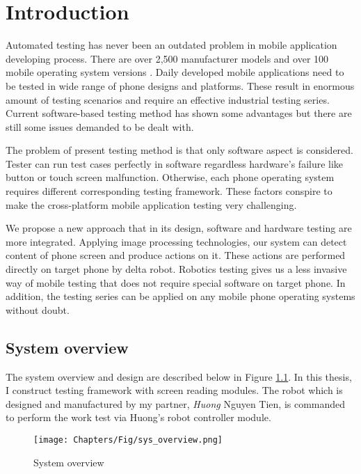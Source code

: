 \chapter{Introduction}

Automated testing has never been an outdated problem in mobile application developing process. There are over 2,500 manufacturer models and over 100 mobile operating system versions \cite{crittercism}. Daily developed mobile applications need to be tested in wide range of phone designs and platforms. These result in enormous amount of testing scenarios and require an effective industrial testing series. Current software-based testing method has shown some advantages but there are still some issues demanded to be dealt with.

The problem of present testing method is that only software aspect is considered. Tester can run test cases perfectly in software regardless hardware's failure like button or touch screen malfunction. Otherwise, each phone operating system requires different corresponding testing framework. These factors conspire to make the cross-platform mobile application testing very challenging. \nocite{weinman_thesis}

We propose a new approach that in its design, software and hardware testing are more integrated. Applying image processing technologies, our system can detect content of phone screen and produce actions on it. These actions are performed directly on target phone by delta robot. Robotics testing gives us a less invasive way of mobile testing that does not require special software on target phone. In addition, the testing series can be applied on any mobile phone operating systems without doubt.

\section{System overview}
The system overview and design are described below in Figure \ref{fig:sys_overview}.
In this thesis, I construct testing framework with screen reading modules. The robot which is designed and manufactured by my partner, \textit{Huong} Nguyen Tien, is commanded to perform the work test via Huong's robot controller module.

	\begin{figure}
		\centering
		\texttt{[image: Chapters/Fig/sys\_overview.png]}
		\caption{System overview}
		\label{fig:sys_overview}
	\end{figure}

